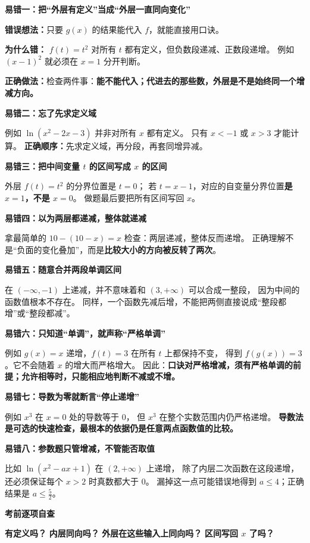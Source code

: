 \clearpage
\begin{trapbox}
\textbf{\textcolor{CTrap}{易错一：把“外层有定义”当成“外层一直同向变化”}}

\textbf{错误想法：}只要 $g(x)$ 的结果能代入 $f$，就能直接用口诀。

\textbf{为什么错：} $f(t)=t^2$ 对所有 $t$ 都有定义，但负数段递减、正数段递增。
例如 $(x-1)^2$ 就必须在 $x=1$ 分开判断。

\textbf{正确做法：}检查两件事：\textbf{能不能代入；代进去的那些数，外层是不是始终同一个增减方向。}

\medskip
\textbf{\textcolor{CTrap}{易错二：忘了先求定义域}}

例如 $\ln(x^2-2x-3)$ 并非对所有 $x$ 都有定义。
只有 $x<-1$ 或 $x>3$ 才能计算。
\textbf{正确顺序：}先求定义域，再分段，再套同增异减。

\medskip
\textbf{\textcolor{CTrap}{易错三：把中间变量 $t$ 的区间写成 $x$ 的区间}}

外层 $f(t)=t^2$ 的分界位置是 $t=0$；
若 $t=x-1$，对应的自变量分界位置\textbf{是 $x=1$，不是 $x=0$}。
做题最后要把所有区间写回 $x$。

\medskip
\textbf{\textcolor{CTrap}{易错四：以为两层都递减，整体就递减}}

拿最简单的 $10-(10-x)=x$ 检查：两层递减，整体反而递增。
正确理解不是“负面的变化叠加”，而是\textbf{比较大小的方向被反转了两次}。

\medskip
\textbf{\textcolor{CTrap}{易错五：随意合并两段单调区间}}

在 $(-\infty,-1)$ 上递减，并不意味着和 $(3,+\infty)$ 可以合成一整段，
因为中间的函数值根本不存在。
同样，一个函数先减后增，不能把两侧直接说成“整段都增”或“整段都减”。

\medskip
\end{trapbox}
\clearpage
\begin{trapbox}
\textbf{\textcolor{CTrap}{易错六：只知道“单调”，就声称“严格单调”}}



例如 $g(x)=x$ 递增，$f(t)=3$ 在所有 $t$ 上都保持不变，
得到 $f(g(x))=3$。它不会随着 $x$ 的增大而严格增大。
因此：\textbf{口诀对严格增减，须有严格单调的前提；允许相等时，只能相应地判断不减或不增。}

\medskip
\textbf{\textcolor{CTrap}{易错七：导数为零就断言“停止递增”}}

例如 $x^3$ 在 $x=0$ 处的导数等于 $0$，
但 $x^3$ 在整个实数范围内仍严格递增。
\textbf{导数法是可选的快速检查，最根本的依据仍是任意两点函数值的比较。}

\medskip
\textbf{\textcolor{CTrap}{易错八：参数题只管增减，不管能否取值}}

比如 $\ln(x^2-ax+1)$ 在 $(2,+\infty)$ 上递增，
除了内层二次函数在这段递增，还必须保证每个 $x>2$ 时真数都大于 $0$。
漏掉这一点可能错误地得到 $a\le4$；正确结果是 $a\le\frac52$。

\medskip
\textbf{\textcolor{CTrap}{考前逐项自查}}

\textbf{有定义吗？} \quad
\textbf{内层同向吗？} \quad
\textbf{外层在这些输入上同向吗？} \quad
\textbf{区间写回 $x$ 了吗？}
\end{trapbox}
